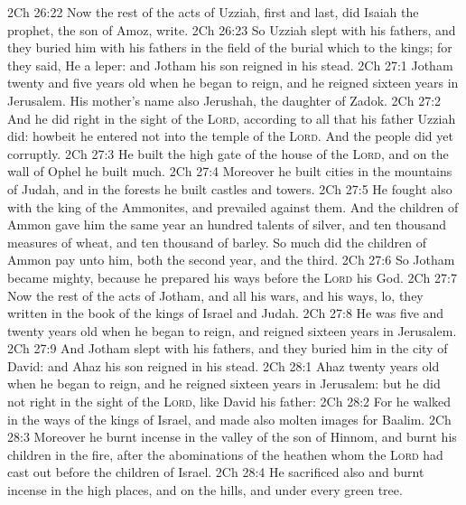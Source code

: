 \vs 2Ch 26:22 Now the rest of the acts of Uzziah, first and last, did Isaiah the prophet, the son of Amoz, write.
\vs 2Ch 26:23 So Uzziah slept with his fathers, and they buried him with his fathers in the field of the burial which  to the kings; for they said, He  a leper: and Jotham his son reigned in his stead.
\vs 2Ch 27:1 Jotham  twenty and five years old when he began to reign, and he reigned sixteen years in Jerusalem. His mother's name also  Jerushah, the daughter of Zadok.
\vs 2Ch 27:2 And he did  right in the sight of the \textsc{Lord}, according to all that his father Uzziah did: howbeit he entered not into the temple of the \textsc{Lord}. And the people did yet corruptly.
\vs 2Ch 27:3 He built the high gate of the house of the \textsc{Lord}, and on the wall of Ophel he built much.
\vs 2Ch 27:4 Moreover he built cities in the mountains of Judah, and in the forests he built castles and towers.
\vs 2Ch 27:5 He fought also with the king of the Ammonites, and prevailed against them. And the children of Ammon gave him the same year an hundred talents of silver, and ten thousand measures of wheat, and ten thousand of barley. So much did the children of Ammon pay unto him, both the second year, and the third.
\vs 2Ch 27:6 So Jotham became mighty, because he prepared his ways before the \textsc{Lord} his God.
\vs 2Ch 27:7 Now the rest of the acts of Jotham, and all his wars, and his ways, lo, they  written in the book of the kings of Israel and Judah.
\vs 2Ch 27:8 He was five and twenty years old when he began to reign, and reigned sixteen years in Jerusalem.
\vs 2Ch 27:9 And Jotham slept with his fathers, and they buried him in the city of David: and Ahaz his son reigned in his stead.
\vs 2Ch 28:1 Ahaz  twenty years old when he began to reign, and he reigned sixteen years in Jerusalem: but he did not  right in the sight of the \textsc{Lord}, like David his father:
\vs 2Ch 28:2 For he walked in the ways of the kings of Israel, and made also molten images for Baalim.
\vs 2Ch 28:3 Moreover he burnt incense in the valley of the son of Hinnom, and burnt his children in the fire, after the abominations of the heathen whom the \textsc{Lord} had cast out before the children of Israel.
\vs 2Ch 28:4 He sacrificed also and burnt incense in the high places, and on the hills, and under every green tree.
